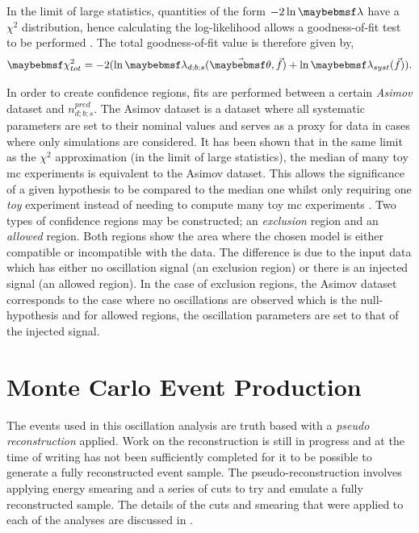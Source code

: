 In the limit of large statistics, quantities of the form $-2\lnOf{\lambda}$ have a $\chi^2$ distribution, hence calculating the log-likelihood allows a goodness-of-fit test to be performed \cite{introduction_to_mathematical_statistics_book}. The total goodness-of-fit value is therefore given by,
\begin{equation}
    \chi^2_{tot} = -2(\lnOf{\lambda_{d;b;s}(\vec{\theta}, \vec{f})} + \lnOf{\lambda_{syst}(\vec{f})}).
\end{equation}

In order to create confidence regions, fits are performed between a certain \textit{Asimov} dataset and $n_{d;b;s}^{pred}$. The Asimov dataset is a dataset where all systematic parameters are set to their nominal values and serves as a proxy for data in cases where only simulations are considered. It has been shown that in the same limit as the $\chi^2$ approximation (in the limit of large statistics), the median of many toy \gls{mc} experiments is equivalent to the Asimov dataset. This allows the significance of a given hypothesis to be compared to the median one whilst only requiring one \textit{toy} experiment instead of needing to compute many toy \gls{mc} experiments \cite{Asimov_dataset}. Two types of confidence regions may be constructed; an \textit{exclusion} region and an \textit{allowed} region. Both regions show the area where the chosen model is either compatible or incompatible with the data. The difference is due to the input data which has either no oscillation signal (an exclusion region) or there is an injected signal (an allowed region). In the case of exclusion regions, the Asimov dataset corresponds to the case where no oscillations are observed which is the null-hypothesis and for allowed regions, the oscillation parameters are set to that of the injected signal. %





\section{Monte Carlo Event Production}

The events used in this oscillation analysis are truth based with a \textit{pseudo reconstruction} applied. Work on the reconstruction is still in progress and at the time of writing has not been sufficiently completed for it to be possible to generate a fully reconstructed event sample. The pseudo-reconstruction involves applying energy smearing and a series of cuts to try and emulate a fully reconstructed sample. The details of the cuts and smearing that were applied to each of the analyses are discussed in .

